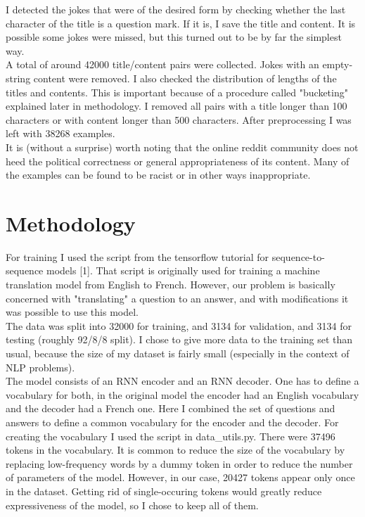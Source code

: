 \documentclass[12pt]{article}
\begin{document}
I detected the jokes that were of the desired form by checking whether the last character of the title is a question mark. If it is, I save the title and content. It is possible some jokes were missed, but this turned out to be by far the simplest way. \\

A total of around 42000 title/content pairs were collected. Jokes with an empty-string content were removed. I also checked the distribution of lengths of the titles and contents. This is important because of a procedure called "bucketing" explained later in methodology. I removed all pairs with a title longer than 100 characters or with content longer than 500 characters. After preprocessing I was left with 38268 examples. \\

It is (without a surprise) worth noting that the online reddit community does not heed the political correctness or general appropriateness of its content. Many of the examples can be found to be racist or in other ways inappropriate.


\section{Methodology}

For training I used the script from the tensorflow tutorial for sequence-to-sequence models [1]. That script is originally used for training a machine translation model from English to French. However, our problem is basically concerned with "translating" a question to an answer, and with modifications it was possible to use this model. \\

The data was split into 32000 for training, and 3134 for validation, and 3134 for testing (roughly 92/8/8 split). I chose to give more data to the training set than usual, because the size of my dataset is fairly small (especially in the context of NLP problems). \\

The model consists of an RNN encoder and an RNN decoder. One has to define a vocabulary for both, in the original model the encoder had an English vocabulary and the decoder had a French one. Here I combined the set of questions and answers to define a common vocabulary for the encoder and the decoder. For creating the vocabulary I used the script in data\_utils.py. There were 37496 tokens in the vocabulary. It is common to reduce the size of the vocabulary by replacing low-frequency words by a dummy token in order to reduce the number of parameters of the model. However, in our case, 20427 tokens appear only once in the dataset. Getting rid of single-occuring tokens would greatly reduce expressiveness of the model, so I chose to keep all of them. \\
\end{document}

